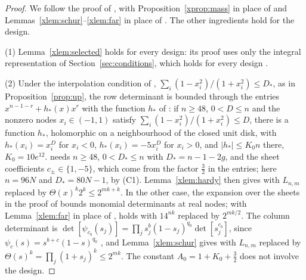 \documentclass[11pt]{article}
\theoremstyle{definition}
\begin{document}
\begin{proof}
We follow the proof of \cite[Theorem~6.3]{Jha}, with Proposition~\ref{xprop:mass} in place of \cite[Proposition~5.4]{Jha} and Lemmas~\ref{xlem:schur}--\ref{xlem:far} in place of \cite[Lemmas~4.1, 4.5, Corollary~4.2]{Jha}. The other ingredients hold for the design.

(1) Lemma~\ref{xlem:selected} holds for every design: its proof uses only the integral representation of Section~\ref{sec:conditions}, which holds for every design \cite[Sec.~5.1]{OAI}.

(2) Under the interpolation condition of \cite[Lemma~6.2]{Jha}, $\sum_i(1-x_i^2)/(1+x_i^2)\le D_*$, as in Proposition~\ref{prop:up}, the row determinant is bounded through the entries $x^{n-1-r}+h_*(x)x^r$ with the function $h_*$ of \cite[Lemma~4.3]{Jha}: if $n\ge48$, $0<D\le n$ and the nonzero nodes $x_i\in(-1,1)$ satisfy $\sum_i(1-x_i^2)/(1+x_i^2)\le D$, there is a function $h_*$, holomorphic on a neighbourhood of the closed unit disk, with $h_*(x_i)=x_i^D$ for $x_i<0$, $h_*(x_i)=-5x_i^D$ for $x_i>0$, and $|h_*|\le K_0n$ there, $K_0=10e^{12}$. \cite[Lemma~4.3]{Jha} needs $n\ge48$, $0<D_*\le n$ with $D_*=n-1-2g$, and the sheet coefficients $c_\pm\in\{1,-5\}$, which come from the factor $\frac32$ in the entries; here $n=96N$ and $D_*=80N-1$, by (C1). Lemma~\ref{xlem:hardy} then gives \cite[(6.5)]{Jha} with $L_{n,m}$ replaced by $\Theta(x)^k2^k\le2^{mk+k}$. In the other case, the expansion over the sheets in the proof of \cite[Lemma~6.2]{Jha} bounds monomial determinants at real nodes; with Lemma~\ref{xlem:far} in place of \cite[Lemma~4.5]{Jha}, \cite[(6.6)]{Jha} holds with $14^{nk}$ replaced by $2^{mk/2}$. The column determinant is $\det[\psi_{c_b}(s_j)]=\prod_js_j^b(1-s_j)^{q_0}\det[s_j^{c_b}]$, since $\psi_c(s)=s^{b+c}(1-s)^{q_0}$ \cite[(2.11)]{Jha}, and Lemma~\ref{xlem:schur} gives \cite[(6.7)]{Jha} with $L_{n,m}$ replaced by $\Theta(s)^k=\prod_j(1+s_j)^k\le2^{mk}$. The constant $A_0=1+K_0+\frac32$ does not involve the design.


\end{proof}
\end{document}
